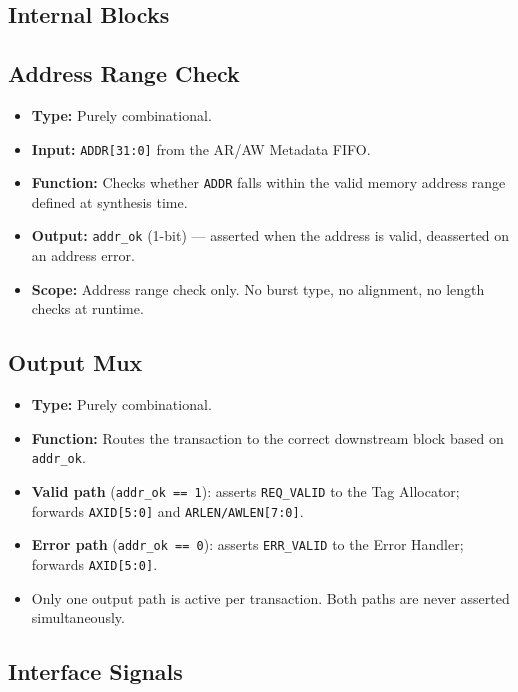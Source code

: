 \subsection{Internal Blocks}

\subsection{Address Range Check}

\begin{itemize}
  \item \textbf{Type:} Purely combinational.
  \item \textbf{Input:} \texttt{ADDR[31:0]} from the AR/AW Metadata
        FIFO.
  \item \textbf{Function:} Checks whether \texttt{ADDR} falls within
        the valid memory address range defined at synthesis time.
  \item \textbf{Output:} \texttt{addr\_ok} (1-bit) — asserted when the
        address is valid, deasserted on an address error.
  \item \textbf{Scope:} Address range check only. No burst type, no
        alignment, no length checks at runtime.
\end{itemize}

\subsection{Output Mux}

\begin{itemize}
  \item \textbf{Type:} Purely combinational.
  \item \textbf{Function:} Routes the transaction to the correct
        downstream block based on \texttt{addr\_ok}.
  \item \textbf{Valid path} (\texttt{addr\_ok == 1}): asserts
        \texttt{REQ\_VALID} to the Tag Allocator; forwards
        \texttt{AXID[5:0]} and \texttt{ARLEN/AWLEN[7:0]}.
  \item \textbf{Error path} (\texttt{addr\_ok == 0}): asserts
        \texttt{ERR\_VALID} to the Error Handler; forwards
        \texttt{AXID[5:0]}.
  \item Only one output path is active per transaction. Both paths are
        never asserted simultaneously.
\end{itemize}

\subsection{Interface Signals}

